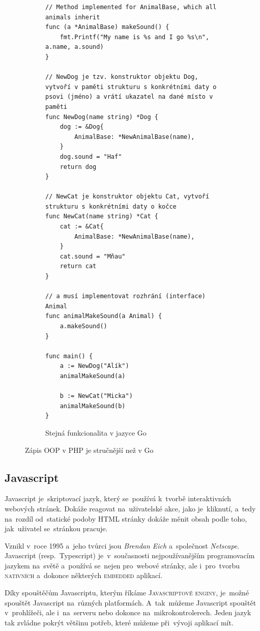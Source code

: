 \documentclass[14pt,a4paper]{article}
\begin{document}
\begin{figure}
\begin{subfigure}[b]{0.45\linewidth}
\begin{verbatim}
// Method implemented for AnimalBase, which all animals inherit
func (a *AnimalBase) makeSound() {
	fmt.Printf("My name is %s and I go %s\n", a.name, a.sound)
}

// NewDog je tzv. konstruktor objektu Dog, vytvoří v paměti strukturu s konkrétními daty o psovi (jméno) a vrátí ukazatel na dané místo v paměti
func NewDog(name string) *Dog {
	dog := &Dog{
		AnimalBase: *NewAnimalBase(name),
	}
	dog.sound = "Haf"
	return dog
}

// NewCat je konstruktor objektu Cat, vytvoří strukturu s konkrétními daty o kočce
func NewCat(name string) *Cat {
	cat := &Cat{
		AnimalBase: *NewAnimalBase(name),
	}
	cat.sound = "Mňau"
	return cat
}

// a musí implementovat rozhrání (interface) Animal
func animalMakeSound(a Animal) {
    a.makeSound()
}

func main() {
	a := NewDog("Alík")
	animalMakeSound(a)

	b := NewCat("Micka")
	animalMakeSound(b)
}
                \end{verbatim}
                \label{oop:golang}
                \caption{Stejná funkcionalita v jazyce Go}
            \end{subfigure}
            \label{oop:difference}
            \caption{Zápis OOP v PHP je stručnější než v Go}
        \end{figure}

        \subsection{Javascript}
        Javascript je~skriptovací jazyk, který se~používá k~tvorbě interaktivních webových stránek. Dokáže reagovat na~uživatelské akce, jako je~kliknutí, a~tedy na~rozdíl od~statické podoby HTML stránky dokáže měnit obsah podle toho, jak~uživatel se~stránkou pracuje.

        Vznikl v~roce 1995 a~jeho tvůrci jsou \emph{Brendan Eich} a~společnost \emph{Netscape}. Javascript (resp.~Typescript) je~v~současnosti nejpoužívanějším programovacím jazykem na~světě a~používá se~nejen pro~webové stránky, ale i~pro~tvorbu \textsc{nativních} a~dokonce některých \textsc{embedded} aplikací.

        Díky spouštěčům Javascriptu, kterým říkáme \textsc{Javascriptové enginy}, je~možné spouštět Javascript na~různých platformách. A~tak~můžeme Javascript spouštět v~prohlížeči, ale i~na~serveru nebo dokonce na~mikrokontrolerech. Jeden jazyk tak zvládne pokrýt většinu potřeb, které můžeme při~vývoji aplikací mít.
\end{document}
